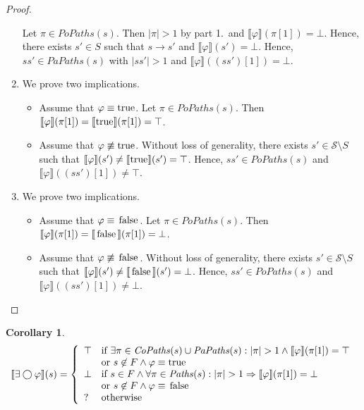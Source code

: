 \documentclass[12pt]{article}
\newcommand{\nxt}{\bigcirc}
\newcommand{\TRUE}{\mbox{\lstinline{true}}}
\newcommand{\FALSE}{\mbox{\lstinline{false}}}
\newtheorem{corollary}{Corollary}
\theoremstyle{definition}
\newcommand{\satisfaction}[1]{\llbracket #1 \rrbracket}
\newcommand{\bottom}{\mathord{\perp}}
\newenvironment{franck}{\color{red}}{\color{black}}
\begin{document}
\begin{franck}
\begin{proof}
\begin{enumerate}
\[\]
Let $\pi \in \mathit{PoPaths}(s)$.  Then $|\pi| > 1$ by part 1.\ and $\satisfaction{\varphi}(\pi[1]) = \bottom$.  Hence, there exists $s' \in S$ such that $s \rightarrow s'$ and $\satisfaction{\varphi}(s') = \bottom$.  Hence, $s s' \in \mathit{PaPaths}(s)$ with $|s s'| > 1$ and $\satisfaction{\varphi}((s s')[1]) = \bottom$.
\item
We prove two implications.
\begin{itemize}
\item 
Assume that $\varphi \equiv \TRUE$.  Let $\pi \in \mathit{PoPaths}(s)$.  Then $\satisfaction{\varphi}(\pi[1]) = \satisfaction{\TRUE}(\pi[1]) = \top$.
\item
Assume that $\varphi \not\equiv \TRUE$.  Without loss of generality, there exists $s' \in \mathcal{S} \setminus S$ such that $\satisfaction{\varphi}(s') \not= \satisfaction{\TRUE}(s') = \top$.  Hence, $s s' \in \mathit{PoPaths}(s)$ and $\satisfaction{\varphi}((s s')[1]) \not= \top$.
\end{itemize}
\item
We prove two implications.
\begin{itemize}
\item 
Assume that $\varphi \equiv \FALSE$.  Let $\pi \in \mathit{PoPaths}(s)$.  Then $\satisfaction{\varphi}(\pi[1]) = \satisfaction{\FALSE}(\pi[1]) = \bottom$.
\item
Assume that $\varphi \not\equiv \FALSE$.  Without loss of generality, there exists $s' \in \mathcal{S} \setminus S$ such that $\satisfaction{\varphi}(s') \not= \satisfaction{\FALSE}(s') = \bottom$.  Hence, $s s' \in \mathit{PoPaths}(s)$ and $\satisfaction{\varphi}((s s')[1]) \not= \bottom$.
\end{itemize}
\end{enumerate}
\end{proof}

\begin{corollary}
\[
\satisfaction{\exists \nxt \varphi}(s) = \left \{
\begin{array}{ll}
\top & \mbox{if $\exists \pi \in \mathit{CoPaths}(s) \cup \mathit{PaPaths}(s) : |\pi| > 1 \wedge \satisfaction{\varphi}(\pi[1]) = \top$}\\
& \mbox{or $s \not\in F \wedge \varphi \equiv \TRUE$}\\
\bottom & \mbox{if $s \in F \wedge \forall \pi \in \mathit{Paths}(s) : |\pi| > 1 \Rightarrow \satisfaction{\varphi}(\pi[1]) = \bottom$}\\
& \mbox{or $s \not\in F \wedge \varphi \equiv \FALSE$}\\
? & \mbox{otherwise}
\end{array}
\right .
\]
\end{corollary}


\end{franck}
\end{document}
